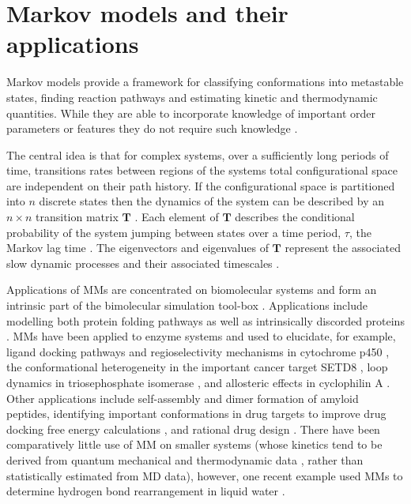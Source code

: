 \section{Markov models and their applications}
Markov models provide a framework for classifying conformations into metastable states, finding reaction pathways and estimating kinetic and thermodynamic quantities. While they are able to incorporate knowledge of important order parameters or features they do not require such knowledge \cite{husicMarkovStateModels2018, pandeEverythingYouWanted2010}.

The central idea \cite{zwanzigClassicalDynamicsContinuous1983a} is that for complex systems, over a sufficiently long periods of time, transitions rates between regions of the systems total configurational space are independent on their path history. If the configurational space is partitioned into $n$ discrete states then the dynamics of the system can be described by an $n\times n$ transition matrix $\mathbf{T}$ \cite{prinzMarkovModelsMolecular2011}. Each element of $\mathbf{T}$ describes the conditional probability of the system jumping between states over a time period, $\tau$, the Markov lag time \cite{prinzMarkovModelsMolecular2011}. The eigenvectors and eigenvalues of $\mathbf{T}$ represent the associated slow dynamic processes and their associated timescales \cite{prinzMarkovModelsMolecular2011}. 

Applications of MMs are concentrated on biomolecular systems and form an intrinsic part of the bimolecular simulation tool-box \cite{hugginsBiomolecularSimulationsDynamics2019}. Applications include modelling both protein folding pathways \cite{singhalUsingPathSampling2004,swopeDescribingProteinFolding2004} as well as intrinsically discorded proteins \cite{schorAnalyticalMethodsStructural2016a}. 
MMs have been applied to enzyme systems and used to elucidate, for example, ligand docking pathways \cite{ahalawatMappingSubstrateRecognition2018a} and regioselectivity mechanisms in cytochrome p450 \cite{dodaniDiscoveryRegioselectivitySwitch2016a}, the conformational heterogeneity in the important cancer target SETD8 \cite{chenDynamicConformationalLandscape2019a}, loop dynamics in triosephosphate isomerase \cite{LoopMotionTriosephosphate}, and allosteric effects in cyclophilin A \cite{wapeesittipanAllostericEffectsCyclophilin2019}. Other applications include self-assembly \cite{senguptaAutomatedMarkovState2019} and dimer formation \cite{leahyCoarseMasterEquations2016} of amyloid peptides, identifying important conformations in drug targets to improve drug docking free energy calculations \cite{amaroEnsembleDockingDrug2018}, and rational drug design \cite{gervasioBiomolecularSimulationsStructureBased2019}. There have been comparatively little use of MM on smaller systems (whose kinetics tend to be derived from quantum mechanical and thermodynamic data \cite{glowackiMESMEROpenSourceMaster2012, pillingMasterEquationModels2003}, rather than statistically estimated from MD data), however, one recent example used MMs to determine hydrogen bond rearrangement in liquid water \cite{schulzCollectiveHydrogenbondRearrangement2018}. 

